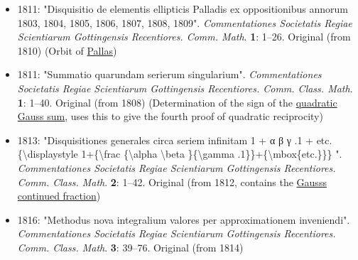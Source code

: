 \begin{itemize}
  \begin{itemize}
  \tightlist
  \item
    {\href{https://archive.org/details/theoryofmotionof00gausrich/}{\emph{Theory of the Motion of Heavenly Bodies Moving about the Sun in Conic Sections}}. Translated by \href{https://en.wikipedia.org/wiki/Charles_Henry_Davis}{Davis, Charles Henry}. Little, Brown \& Co. 1857.{}}
  \item
    {\emph{Theory of the motion of the celestial bodies moving around the Sun in conic sections. Reprint of the 1809 original. (Theoria motus corporum coelestium in sectionibus conicis solem ambientium.) (Latin)}. Cambridge Library Collection - Mathematics. \href{https://en.wikipedia.org/wiki/Cambridge_University_Press}{Cambridge University Press}. 2011. \href{https://en.wikipedia.org/wiki/ISBN_(identifier)}{ISBN}{~}\href{https://en.wikipedia.org/wiki/Special:BookSources/978-1-108-14311-0}{978-1-108-14311-0}. \href{https://en.wikipedia.org/wiki/Zbl_(identifier)}{Zbl}{~}\href{https://zbmath.org/?format=complete&q=an:1234.01016}{1234.01016}.{}}
  \end{itemize}
\item
  {1811: "Disquisitio de elementis ellipticis Palladis ex oppositionibus annorum 1803, 1804, 1805, 1806, 1807, 1808, 1809". \emph{Commentationes Societatis Regiae Scientiarum Gottingensis Recentiores. Comm. Math}. \textbf{1}: {1--}26.{} Original (from 1810) (Orbit of \href{https://en.wikipedia.org/wiki/2_Pallas}{Pallas})}
\item
  {1811: "Summatio quarundam serierum singularium". \emph{Commentationes Societatis Regiae Scientiarum Gottingensis Recentiores. Comm. Class. Math}. \textbf{1}: {1--}40.{} Original (from 1808) (Determination of the sign of the \href{https://en.wikipedia.org/wiki/Quadratic_Gauss_sum}{quadratic Gauss sum}, uses this to give the fourth proof of quadratic reciprocity)}
\item
  {1813: "Disquisitiones generales circa seriem infinitam 1 + α β γ .1 + etc. \{\textbackslash displaystyle 1+\{\textbackslash frac \{\textbackslash alpha \textbackslash beta \}\{\textbackslash gamma .1\}\}+\{\textbackslash mbox\{etc.\}\}\} ". \emph{Commentationes Societatis Regiae Scientiarum Gottingensis Recentiores. Comm. Class. Math}. \textbf{2}: {1--}42.{} Original (from 1812, contains the \href{https://en.wikipedia.org/wiki/Gauss's_continued_fraction}{Gauss\textquotesingle s continued fraction})}
\item
  {1816: "Methodus nova integralium valores per approximationem inveniendi". \emph{Commentationes Societatis Regiae Scientiarum Gottingensis Recentiores. Comm. Class. Math}. \textbf{3}: {39--}76.{} Original (from 1814)}

\end{itemize}
